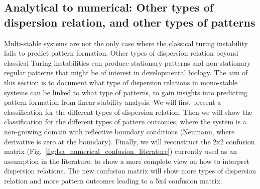 
\subsection{Analytical to numerical: Other types of dispersion relation, and other types of patterns} \label{nogrowth}
Multi-stable systems are not the only case where the classical turing instability fails to predict pattern formation.
Other types of dispersion relation beyond classical Turing instabilities can produce stationary patterns and non-stationary regular patterns that might be of interest in developmental biology.
The aim of this section is to document what type of dispersion relations in mono-stable systems can be linked to what type of patterns, to gain insights into predicting pattern formation from linear stability analysis.
We will first present a classification for the different types of dispersion relation.
Then we will show the classification for the different types of pattern outcomes, where the system is a non-growing domain with reflective boundary conditions (Neumann, where derivative is zero at the boundary).
Finally, we will reconstruct the 2x2 confusion matrix (Fig.~\ref{fig:lsa_numerical_confusion_literature}) currently used as an assumption in the literature, to show a more complete view on how to interpret dispersion relations.
The new confusion matrix will show more types of dispersion relation and more pattern outcomes leading to a 5x4 confusion matrix.

